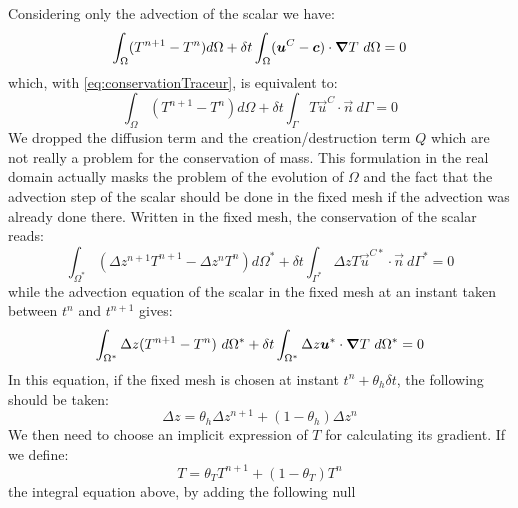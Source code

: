 Considering only the advection of the scalar we have:
\begin{equation}
\int_{\Omega}(T^{n+1}-T^{n})d\Omega+\delta t\int_{\Omega}(\bm{u}^C-\bm{c})
\cdot \bm{\nabla} T ~d\Omega=0
\label{eq:advectionTraceur}
\end{equation}
which, with \eqref{eq:conservationTraceur}, is equivalent to:
\begin{equation}
\int_{\Omega}(T^{n+1}-T^{n})d\Omega+\delta t\int_{\Gamma}T\vec{u}^C\cdot
\vec{n}~d\Gamma=0
\end{equation}
We dropped the diffusion term and the creation/destruction
term $Q$ which are not really a problem for the conservation of mass.
This formulation in the real domain actually masks the problem of the
evolution of $\Omega$ and the fact that the advection step
of the scalar should be done in the fixed mesh if the advection
was already done there. Written in the fixed mesh,
the conservation of the scalar reads:
\begin{equation}
\int_{\Omega^{\ast}}(\Delta z^{n+1}T^{n+1}-\Delta z^{n}T^{n})d\Omega^{\ast}
+\delta t\int_{\Gamma^{\ast}}\Delta zT\vec{u}^{C\ast}\cdot\vec{n}
~d\Gamma^{\ast}=0
\end{equation}
while the advection equation of the scalar
in the fixed mesh at an instant taken between $t^{n}$ and $t^{n+1}$
gives:
\begin{equation}
\int_{\Omega^{\ast}}\Delta z(T^{n+1}-T^{n})~d\Omega^{\ast}+\delta t
\int_{\Omega^{\ast}}\Delta z\bm{u}^{\ast}\cdot\bm{\nabla} T~d\Omega^{\ast}=0
\label{convT}
\end{equation}
In this equation, if the fixed mesh is chosen at instant $t^{n}+\theta
_{h}\delta t$, the following should be taken:
\begin{equation}
\Delta z=\theta_{h}\Delta z^{n+1}+(1-\theta_{h})\Delta z^{n}%
\end{equation}
We then need to choose an implicit expression of $T$ for calculating its
gradient. If we define:
\begin{equation}
T=\theta_{T}T^{n+1}+(1-\theta_{T})T^{n}%
\end{equation}
the integral equation above, by adding the following null
